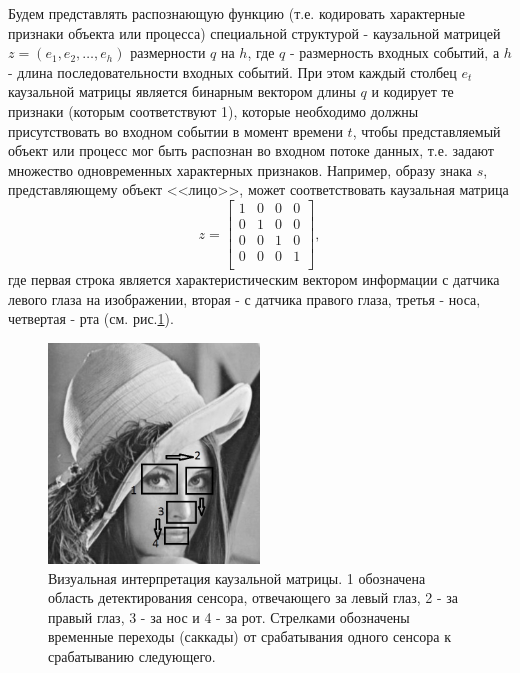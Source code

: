 \documentclass[12pt]{scrartcl}
\begin{document}
	Будем представлять распознающую функцию (т.е. кодировать характерные признаки объекта или процесса) специальной структурой - каузальной матрицей $z=(e_1,e_2,\dots,e_h)$ размерности $q$ на $h$, где $q$ - размерность входных событий, а $h$ - длина последовательности входных событий. При этом каждый столбец $e_t$ каузальной матрицы является бинарным вектором длины $q$ и кодирует те признаки (которым соответствуют 1), которые необходимо должны присутствовать во входном событии в момент времени $t$, чтобы представляемый объект или процесс мог быть распознан во входном потоке данных, т.е. задают множество одновременных характерных признаков. Например, образу знака $s$, представляющему объект <<лицо>>, может соответствовать каузальная матрица 	
	\[
		z=\begin{bmatrix}
			1 & 0 & 0 & 0\\
			0 & 1 & 0 & 0\\
			0 & 0 & 1 & 0\\
			0 & 0 & 0 & 1\\
		\end{bmatrix},
	\]
	где первая строка является характеристическим вектором информации с датчика левого глаза на изображении, вторая - с датчика правого глаза, третья - носа, четвертая - рта (см. рис.\ref{fig:face}).

	\begin{figure}
		\label{fig:face}
		\centering
		\includegraphics[width=0.5\textwidth]{misc/photos/face}
		\caption{Визуальная интерпретация каузальной матрицы. 1 обозначена область детектирования сенсора, отвечающего за левый глаз, 2 - за правый глаз, 3 - за нос и 4 - за рот. Стрелками обозначены временные переходы (саккады) от срабатывания одного сенсора к срабатыванию следующего.}		
	\end{figure}
\end{document}
